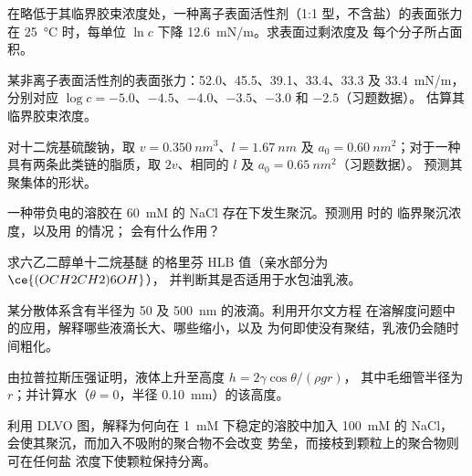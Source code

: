 \begin{exercise}[$\star\star$]\label{exo:b3:colloids:5}
在略低于其临界胶束浓度处，一种离子表面活性剂（1:1 型，不含盐）的表面张力
在 \qty{25}{\celsius} 时，每单位 $\ln c$ 下降 \qty{12.6}{mN/m}。求表面过剩浓度及
每个分子所占面积。
\end{exercise}

\begin{exercise}[$\star\star$]\label{exo:b3:colloids:6}
某非离子表面活性剂的表面张力：52.0、45.5、39.1、33.4、33.3 及
\qty{33.4}{mN/m}，分别对应 $\log c = -5.0$、$-4.5$、$-4.0$、$-3.5$、$-3.0$ 和 $-2.5$（习题数据）。
估算其临界胶束浓度。
\end{exercise}

\begin{exercise}[$\star\star$]\label{exo:b3:colloids:7}
对十二烷基硫酸钠，取 $v = \qty{0.350}{nm^3}$、$l = \qty{1.67}{nm}$ 及 $a_0 = \qty{0.60}{nm^2}$；对于一种
具有两条此类链的脂质，取 $2v$、相同的 $l$ 及 $a_0 = \qty{0.65}{nm^2}$（习题数据）。
预测其聚集体的形状。
\end{exercise}

\begin{exercise}[$\star\star$]\label{exo:b3:colloids:8}
一种带负电的溶胶在 \qty{60}{mM} 的 NaCl 存在下发生聚沉。预测用  时的
临界聚沉浓度，以及用  的情况； 会有什么作用？
\end{exercise}

\begin{exercise}[$\star\star$]\label{exo:b3:colloids:9}
求六乙二醇单十二烷基醚
 的格里芬 HLB 值（亲水部分为 $\ce{(OCH2CH2)6OH}$），
并判断其是否适用于水包油乳液。
\end{exercise}

\begin{exercise}[$\star\star\star$]\label{exo:b3:colloids:10}
某分散体系含有半径为 50 及 \qty{500}{nm} 的液滴。利用开尔文方程
在溶解度问题中的应用，解释哪些液滴长大、哪些缩小，以及
为何即使没有聚结，乳液仍会随时间粗化。
\end{exercise}

\begin{exercise}[$\star\star\star$]\label{exo:b3:colloids:11}
由拉普拉斯压强证明，液体上升至高度 $h = 2\gamma\cos\theta/(\rho gr)$，
其中毛细管半径为 $r$；并计算水（$\theta = 0$，半径 \qty{0.10}{mm}）的该高度。
\end{exercise}

\begin{exercise}[$\star\star\star$]\label{exo:b3:colloids:12}
利用 DLVO 图，解释为何向在 \qty{1}{mM} 下稳定的溶胶中加入 \qty{100}{mM} 的 NaCl，
会使其聚沉，而加入不吸附的聚合物不会改变
势垒，而接枝到颗粒上的聚合物则可在任何盐
浓度下使颗粒保持分离。
\end{exercise}


